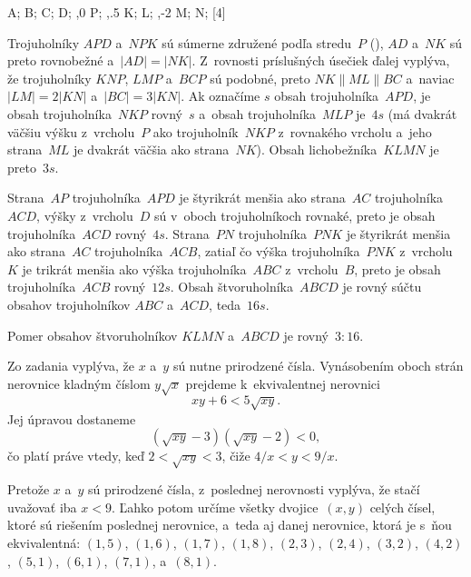 {%
\fontplace
\rtpoint A; \ltpoint B; \lbpoint C; \rbpoint D;
\bpoint{},0 P; \rtpoint{},.5 K; \lbpoint L;
\lpoint{},-2 M; \rbpoint N;
[4]
\hfil\Obr

Trojuholníky $APD$ a~$NPK$ sú súmerne združené podľa stredu~$P$
(\obr), $AD$ a~$NK$ sú preto rovnobežné a~$|AD|=|NK|$.
Z~rovnosti príslušných úsečiek ďalej vyplýva, že trojuholníky $KNP$,
$LMP$ a~$BCP$ sú podobné, preto $NK\parallel ML\parallel BC$
a~naviac $|LM|=2|KN|$ a~$|BC|=3|KN|$. Ak označíme $s$ obsah
trojuholníka~$APD$, je obsah trojuholníka~$NKP$ rovný~$s$ a~obsah
trojuholníka~$MLP$ je~$4s$ (má dvakrát väčšiu výšku z~vrcholu~$P$ ako
trojuholník~$NKP$ z~rovnakého vrcholu a~jeho strana~$ML$ je dvakrát
väčšia ako strana~$NK$). Obsah lichobežníka~$KLMN$ je preto~$3s$.

\inspicture

Strana~$AP$ trojuholníka~$APD$ je štyrikrát menšia ako strana~$AC$
trojuholníka~$ACD$, výšky z~vrcholu~$D$ sú v~oboch
trojuholníkoch rovnaké, preto je obsah trojuholníka~$ACD$ rovný~$4s$.
Strana~$PN$ trojuholníka~$PNK$ je štyrikrát menšia ako
strana~$AC$ trojuholníka~$ACB$, zatiaľ čo výška trojuholníka~$PNK$
z~vrcholu~$K$ je trikrát menšia ako výška trojuholníka~$ABC$
z~vrcholu~$B$, preto je obsah trojuholníka~$ACB$ rovný~$12s$.
Obsah štvoruholníka~$ABCD$ je rovný súčtu obsahov trojuholníkov
$ABC$ a~$ACD$, teda~$16s$.

Pomer obsahov štvoruholníkov $KLMN$ a~$ABCD$ je rovný~$3:16$.}

{%
Zo zadania vyplýva, že $x$ a~$y$ sú nutne prirodzené čísla.
Vynásobením oboch strán nerovnice kladným číslom $y\sqrt x$
prejdeme k~ekvivalentnej nerovnici
$$
xy+6<5\sqrt{xy}.
$$
Jej úpravou dostaneme
$$
(\sqrt{xy}-3)(\sqrt{xy}-2)<0,
$$
čo platí práve vtedy, keď $2<\sqrt{xy}<3$, čiže $4/x<y<9/x$.

Pretože $x$ a~$y$ sú prirodzené čísla, z~poslednej nerovnosti
vyplýva, že stačí uvažovať iba $x<9$.
Ľahko potom určíme všetky dvojice~$(x,y)$ celých čísel, ktoré sú
riešením poslednej nerovnice, a~teda aj danej nerovnice, ktorá je
s~ňou ekvivalentná: $(1,5)$, $(1,6)$, $(1,7)$, $(1,8)$, $(2,3)$,
$(2,4)$, $(3,2)$, $(4,2)$, $(5,1)$, $(6,1)$, $(7,1)$,
a~$(8,1)$.}

